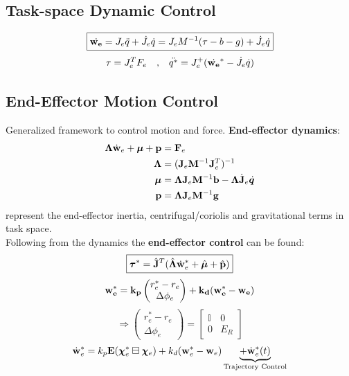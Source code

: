 \documentclass[a4paper, 8pt]{extarticle}
\begin{document}
\begin{multicols*}{3}
\subsection{Task-space Dynamic Control}
$$\boxed{\dot{\bf w_{e}}
 =J_{e} \ddot{q} + \dot{J_{e}} \dot{q}=J_{e}M^{-1}(\tau - b -g)+\dot{J_{e}} \dot{q}}$$
 $$ \tau = J_{e}^{T}F_{e} \quad \textrm{,} \quad \ddot{q^*} = J_{e}^+ (\dot{\bf w_{e}}^* - \dot{J_{e}} \dot{{q}})$$ 
\subsection*{End-Effector Motion Control}
Generalized framework to control motion and force. \textbf{End-effector dynamics}:
\begin{align*}
\bm\Lambda \dot{\bf w}_e + \bm\mu + {\bf p} &= {\bf F}_e  \\
\bm\Lambda &= ({\bf J}_e{\bf M}^{-1}{\bf J}_e^T)^{-1} \\
\bm\mu     &= {\bm\Lambda}{\bf J}_e{\bf M}^{-1}{\bf b} - {\bm\Lambda}\dot{\bf J}_e\dot{\bm q} \\
{\bf p}    &= {\bm\Lambda}{\bf J}_e{\bf M}^{-1}{\bf g} \\
\end{align*}
represent the end-effector inertia, centrifugal/coriolis and gravitational terms in task space.\\
Following from the dynamics the \textbf{end-effector control} can be found:
$$\boxed{\bm\tau^* = \hat{\bf J}^T(\hat{\bm\Lambda} \dot{\bf w}_e^* + \hat{\bm\mu} + \hat{\bf p})}$$
$$\bf w_{e}^* =k_{p}\begin{pmatrix} r_{e}^* -r_{e}\\ \Delta \phi_{e}\end{pmatrix}+k_{d}(w_{e}^* - w_{e})$$
$$ \Rightarrow \begin{pmatrix} r_{e}^* -r_{e}\\ \Delta \phi_{e}\end{pmatrix} =\begin{bmatrix}
\mathbb{I} & 0 \\ 0 & E_{R} \end{bmatrix}$$
$$\dot{\bf w}_e^* = k_p{\bf E}(\bm\chi^*_e \boxminus \bm\chi_e) + k_d({\bf w}_e^* - {\bf w}_e) \underbrace{+ \dot{\bf w}_e^*(t)}_\text{Trajectory Control} $$


\end{multicols*}
\end{document}
